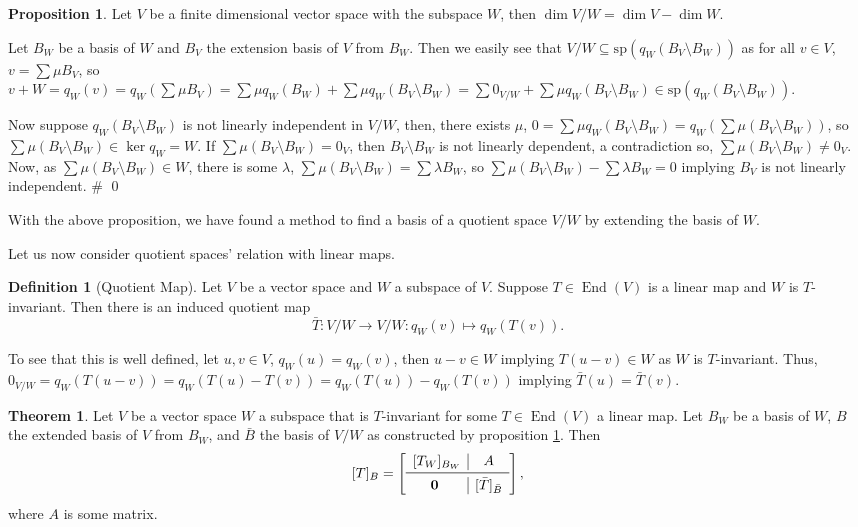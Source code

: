 \documentclass[
]{article}
\theoremstyle{definition}
\newtheorem{theorem}{Theorem}
\newtheorem{prop}{Proposition}[section]
\theoremstyle{definition}
\newtheorem{definition}{Definition}[section]
\begin{document}
\begin{prop}\label{dim_sub}
  Let \(V\) be a finite dimensional vector space with the subspace \(W\), 
  then \(\dim V / W = \dim V - \dim W\).
\end{prop}
\proof

Let \(B_W\) be a basis of \(W\) and \(B_V\) the extension basis of \(V\)
from \(B_W\). Then we easily see that
\(V / W \subseteq \text{sp}(q_W(B_V \setminus B_W))\) as for all
\(v \in V\), \(v = \sum \mu B_V\), so
\(v + W = q_W(v) = q_W(\sum \mu B_V) =  \sum \mu q_W(B_W) + \sum \mu q_W(B_V \setminus B_W) = \sum 0_{V / W} +  \sum \mu q_W(B_V \setminus B_W) \in \text{sp}(q_W(B_V \setminus B_W))\).

Now suppose \(q_W(B_V \setminus B_W)\) is not linearly independent in
\(V / W\), then, there exists \(\mu\),
\(0 = \sum \mu q_W(B_V \setminus B_W) =  q_W (\sum \mu (B_V \setminus B_W))\),
so \(\sum \mu (B_V \setminus B_W) \in  \ker q_W = W\). If
\(\sum \mu (B_V \setminus B_W) = 0_V\), then \(B_V \setminus B_W\) is
not linearly dependent, a contradiction so,
\(\sum \mu (B_V \setminus B_W) \neq 0_V\). Now, as
\(\sum \mu (B_V \setminus B_W) \in W\), there is some \(\lambda\),
\(\sum \mu (B_V \setminus B_W) = \sum \lambda B_W\), so
\(\sum \mu (B_V \setminus B_W) - \sum \lambda B_W = 0\) implying \(B_V\)
is not linearly independent. \# \qed

With the above proposition, we have found a method to find a basis of a
quotient space \(V / W\) by extending the basis of \(W\).

Let us now consider quotient spaces' relation with linear maps.

\begin{definition}[Quotient Map]
  Let \(V\) be a vector space and \(W\) a subspace of \(V\). Suppose 
  \(T \in \mathop{\mathrm{End}}(V)\) is a linear map and \(W\) is \(T\)-invariant. Then there 
  is an induced quotient map 
  \[\bar{T} : V / W \to V / W : q_W(v) \mapsto q_W(T(v)).\]
\end{definition}

To see that this is well defined, let \(u, v \in V\),
\(q_W(u) = q_W(v)\), then \(u - v \in W\) implying \(T(u - v) \in W\) as
\(W\) is \(T\)-invariant. Thus,
\(0_{V / W} = q_W(T(u - v)) = q_W(T(u) - T(v)) = q_W(T(u)) - q_W(T(v))\)
implying \(\bar{T}(u) = \bar{T}(v)\).

\begin{theorem}\label{blocks_quotient}
  Let \(V\) be a vector space \(W\) a subspace that is \(T\)-invariant for some 
  \(T \in \mathop{\mathrm{End}}(V)\) a linear map. Let \(B_W\) be a basis of \(W\), \(B\) the 
  extended basis of \(V\) from \(B_W\), and \(\bar{B}\) the basis of \(V / W\) 
  as constructed by proposition \ref{dim_sub}. Then 
  \[[T]_B = 
    \left[
    \begin{array}{c|c}
      [T_W]_{B_W} & A \\
      \midrule
      \mathbf{0} & [\bar{T}]_{\bar{B}}
    \end{array}
    \right],
  \]
  where \(A\) is some matrix.
\end{theorem}
\proof
\end{document}
